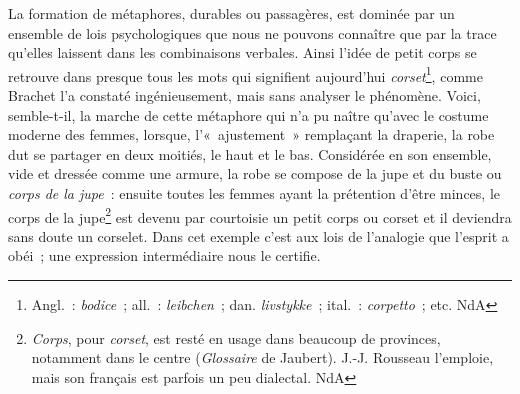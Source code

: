 \documentclass[french,twoside]{book} %
\begin{document}
\noindent La formation de métaphores, durables ou passagères, est dominée par un ensemble de lois psychologiques que nous ne pouvons connaître que par la trace qu’elles laissent dans les combinaisons verbales. Ainsi l’idée de petit corps se retrouve dans presque tous les mots qui signifient aujourd’hui {\itshape corset}\footnote{ Angl. : {\itshape bodice} ; all. : {\itshape leibchen} ; dan. {\itshape livstykke} ; ital. : {\itshape corpetto} ; etc. NdA}, comme Brachet l’a constaté ingénieusement, mais sans analyser le phénomène. Voici, semble-t-il, la marche de cette métaphore qui n’a pu naître qu’avec le costume moderne des femmes, lorsque, l’« ajustement » remplaçant la draperie, la robe dut se partager en deux moitiés, le haut et le bas. Considérée en son ensemble, vide et dressée comme une armure, la robe se compose de la jupe et du buste ou {\itshape corps de la jupe} : ensuite toutes les femmes ayant la prétention d’être minces, le corps de la jupe\footnote{ {\itshape Corps}, pour {\itshape corset}, est resté en usage dans beaucoup de provinces, notamment dans le centre ({\itshape Glossaire} de Jaubert). J.-J. Rousseau l’emploie, mais son français est parfois un peu dialectal. NdA} est devenu par courtoisie un petit corps ou corset et il deviendra sans doute un corselet. Dans cet exemple c’est aux lois de l’analogie que l’esprit a obéi ; une expression intermédiaire nous le certifie.\par
\end{document}

